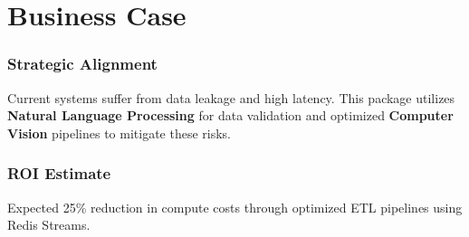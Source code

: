 \documentclass[
]{report}
\author{}
\date{}
\begin{document}
\newcommand{\theProjectName}{NOAA}
\newcommand{\theAuthor}{Rodrigo Souza dos Santos}

\chapter{Business Case}\label{business-case}

\subsection{Strategic Alignment}\label{strategic-alignment}

Current systems suffer from data leakage and high latency. This package
utilizes \textbf{Natural Language Processing} for data validation and
optimized \textbf{Computer Vision} pipelines to mitigate these risks.

\subsection{ROI Estimate}\label{roi-estimate}

Expected 25\% reduction in compute costs through optimized ETL pipelines
using Redis Streams.
\end{document}
